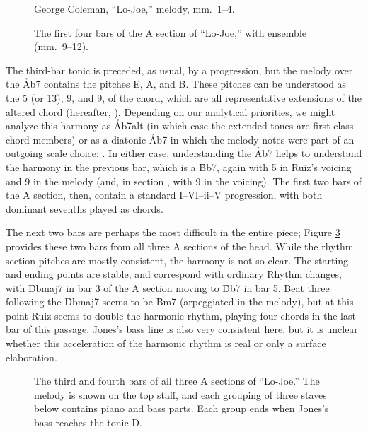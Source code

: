\begin{figure}[tbp]
  \caption{George Coleman, ``Lo-Joe,'' melody, mm.~1--4.}
  \label{lj:opening-melody}
\end{figure}

\begin{figure}[tbp]
  \caption[The first four bars of the A section of ``Lo-Joe,'' with
  ensemble.]{%
    The first four bars of the A section of ``Lo-Joe,'' with ensemble
    (mm.~9--12).}
  \label{lj:opening-ens}
\end{figure}

The third-bar tonic is preceded, as usual, by a \tf progression, but the
melody over the \h{Ab7} contains the pitches E\nat, A\nat, and B\nat. These
pitches can be understood as the \sharp{}5 (or \flat{}13), \flat{}9, and
\sharp{}9, of the chord, which are all representative extensions of the
altered chord (hereafter, \alt). Depending on our analytical
priorities, we might analyze this harmony as \h{Ab7alt} (in which case the
extended tones are first-class chord members) or as a diatonic \h{Ab7} in
which the melody notes were part of an outgoing scale choice:
. In either case, understanding the
\h{Ab7} helps to understand the harmony in the previous bar, which is a
\h{Bb7}, again with \sharp{}5 in Ruiz's voicing and \flat{}9 in the melody
(and, in section , with \sharp{}9 in the voicing). The first two bars of the
A section, then, contain a standard I--VI--ii--V progression, with both
dominant sevenths played as \alt chords.

The next two bars are perhaps the most difficult in the entire piece; Figure
\ref{lj:a-third-fourth} provides these two bars from all three A sections of the
head. While the rhythm section pitches are mostly consistent, the harmony is
not so clear. The starting and ending points are stable, and correspond with
ordinary Rhythm changes, with \h{Dbmaj7} in bar 3 of the A section moving to
\h{Db7} in bar 5. Beat three following the \h{Dbmaj7} seems to be \h{Bm7}
(arpeggiated in the melody), but at this point Ruiz seems to double the
harmonic rhythm, playing four chords in the last bar of this passage. Jones's bass
line is also very consistent here, but it is unclear whether this acceleration
of the harmonic rhythm is real or only a surface elaboration.

\begin{figure}[tbp]
  \caption[The third and fourth bars of all three A sections of ``Lo-Joe.'']{%
    The third and fourth bars of all three A sections of ``Lo-Joe.'' The
    melody is shown on the top staff, and each grouping of three staves below
    contains piano and bass parts. Each group ends when Jones's bass reaches
    the tonic D\protect\flat.}
  \label{lj:a-third-fourth}
\end{figure}

